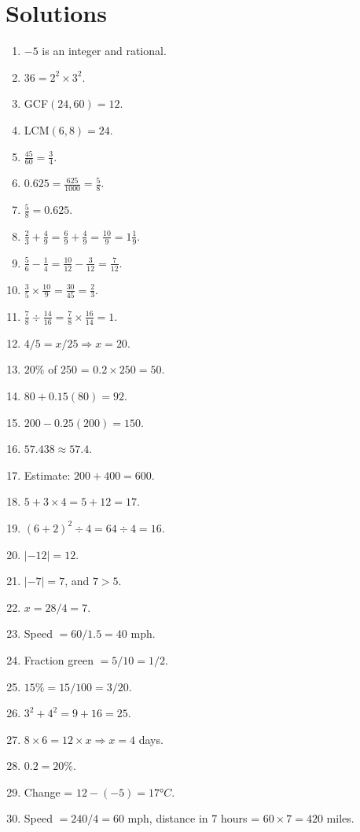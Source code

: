 \documentclass[12pt]{article}
\begin{document}

\newpage
\section*{Solutions}

\begin{enumerate}
    \item $-5$ is an integer and rational.
    \item $36 = 2^2 \times 3^2$.
    \item GCF$(24,60) = 12$.
    \item LCM$(6,8) = 24$.
    \item $\frac{45}{60} = \frac{3}{4}$.
    \item $0.625 = \frac{625}{1000} = \frac{5}{8}$.
    \item $\frac{5}{8} = 0.625$.
    \item $\frac{2}{3} + \frac{4}{9} = \frac{6}{9} + \frac{4}{9} = \frac{10}{9} = 1\frac{1}{9}$.
    \item $\frac{5}{6} - \frac{1}{4} = \frac{10}{12} - \frac{3}{12} = \frac{7}{12}$.
    \item $\frac{3}{5} \times \frac{10}{9} = \frac{30}{45} = \frac{2}{3}$.
    \item $\frac{7}{8} \div \frac{14}{16} = \frac{7}{8} \times \frac{16}{14} = 1$.
    \item $4/5 = x/25 \Rightarrow x = 20$.
    \item $20\%$ of 250 = $0.2 \times 250 = 50$.
    \item $80 + 0.15(80) = 92$.
    \item $200 - 0.25(200) = 150$.
    \item $57.438 \approx 57.4$.
    \item Estimate: $200 + 400 = 600$.
    \item $5 + 3 \times 4 = 5 + 12 = 17$.
    \item $(6 + 2)^2 \div 4 = 64 \div 4 = 16$.
    \item $|-12| = 12$.
    \item $|-7| = 7$, and $7 > 5$.
    \item $x = 28 / 4 = 7$.
    \item Speed $= 60 / 1.5 = 40$ mph.
    \item Fraction green $= 5/10 = 1/2$.
    \item $15\% = 15/100 = 3/20$.
    \item $3^2 + 4^2 = 9 + 16 = 25$.
    \item $8 \times 6 = 12 \times x \Rightarrow x = 4$ days.
    \item $0.2 = 20\%$.
    \item Change = $12 - (-5) = 17°C$.
    \item Speed $= 240/4 = 60$ mph, distance in 7 hours = $60 \times 7 = 420$ miles.
\end{enumerate}
\end{document}
